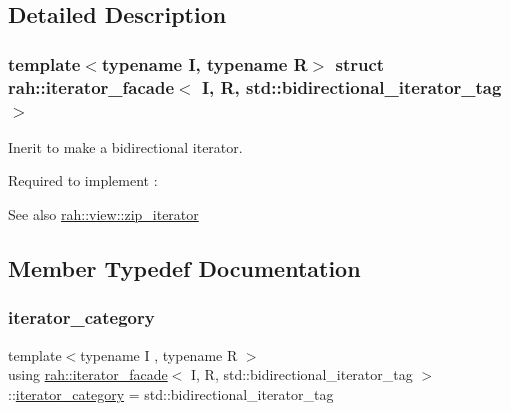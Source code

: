 \subsection{Detailed Description}
\subsubsection*{template$<$typename I, typename R$>$\newline
struct rah\+::iterator\+\_\+facade$<$ I, R, std\+::bidirectional\+\_\+iterator\+\_\+tag $>$}

Inerit to make a bidirectional iterator. 

Required to implement \+: 
\begin{DoxyCode}{0}
\end{DoxyCode}
 \begin{DoxySeeAlso}{See also}
\mbox{\hyperlink{structrah_1_1view_1_1zip__iterator}{rah\+::view\+::zip\+\_\+iterator}} 
\end{DoxySeeAlso}


\subsection{Member Typedef Documentation}
\mbox{\label{structrah_1_1iterator__facade_3_01_i_00_01_r_00_01std_1_1bidirectional__iterator__tag_01_4_a044a4ae4f097558e10b1d52b892a093a}} 
\subsubsection{\texorpdfstring{iterator\_category}{iterator\_category}}
{\footnotesize\ttfamily template$<$typename I , typename R $>$ \\
using \mbox{\hyperlink{structrah_1_1iterator__facade}{rah\+::iterator\+\_\+facade}}$<$ I, R, std\+::bidirectional\+\_\+iterator\+\_\+tag $>$\+::\mbox{\hyperlink{structrah_1_1iterator__facade_3_01_i_00_01_r_00_01std_1_1forward__iterator__tag_01_4_a3ed65491660beef4bd9488a3f511c934}{iterator\+\_\+category}} =  std\+::bidirectional\+\_\+iterator\+\_\+tag}




